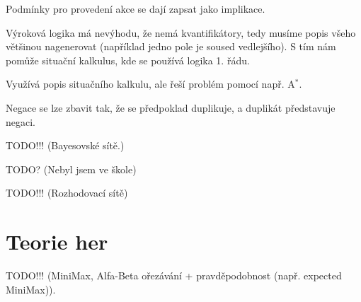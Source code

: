 \documentclass[12pt]{article}					%
\begin{document}
\begin{definice}
	Podmínky pro provedení akce se dají zapsat jako implikace.
\end{definice}

\begin{definice}
	Výroková logika má nevýhodu, že nemá kvantifikátory, tedy musíme popis všeho většinou nagenerovat (například jedno pole je soused vedlejšího). S tím nám pomůže situační kalkulus, kde se používá logika 1. řádu.
\end{definice}

\begin{definice}
	Využívá popis situačního kalkulu, ale řeší problém pomocí např. A$^*$.
\end{definice}

\begin{poznamka}
	Negace se lze zbavit tak, že se předpoklad duplikuje, a duplikát představuje negaci.
\end{poznamka}


TODO!!! (Bayesovské sítě.)


TODO? (Nebyl jsem ve škole)


TODO!!! (Rozhodovací sítě)


\section{Teorie her}

TODO!!! (MiniMax, Alfa-Beta ořezávání + pravděpodobnost (např. expected MiniMax)).
\end{document}
